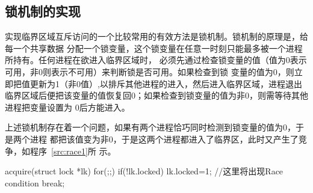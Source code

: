 \documentclass{swfcthesismscctex}
\begin{document}

\subsection{锁机制的实现}
\label{sec:lock}

实现临界区域互斥访问的一个比较常用的有效方法是锁机制。锁机制的原理是，给每一个共享数据
分配一个锁变量，这个锁变量在任意一时刻只能最多被一个进程所持有。任何进程在欲进入临界区域时，
必须先通过检查锁变量的值（值为0表示可用，非0则表示不可用）来判断锁是否可用。如果检查到锁
变量的值为0，则立即把值更新为1（非0值）,以排斥其他进程的进入，然后进入临界区域，进程退出
临界区域后便把该变量的值恢复回0；如果检查到锁变量的值为非0，则需等待其他进程把变量设置为
0后方能进入。

上述锁机制存在着一个问题，如果有两个进程恰巧同时检测到锁变量的值为0，于是两个进程
都把该值变为非0，于是这两个进程都进入了临界区，此时又产生了竞争，如程序~\ref{src:race1}所
示。

\begin{listing}[H]
  \begin{codeblock}
\begin{ccode}
acquire(struct lock *lk){
  for(;;){
    if(!lk.locked) {
      lk.locked=1; //这里将出现Race condition
      break;
    }
  }
}
\end{ccode}
  \end{codeblock}
  \label{src:race1}
\end{listing}
\end{document}
